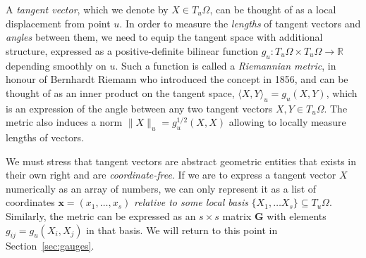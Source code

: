 A {\em tangent vector}, which we denote by $X\in T_u\Omega$, can be thought of as a local displacement from point $u$. 
In order to measure the \emph{lengths} of tangent vectors and  \emph{angles} between them, %
%
%
we need to equip the tangent space with additional structure, expressed as a 
positive-definite bilinear function
$g_u: T_u\Omega \times T_u\Omega \rightarrow \mathbb{R}$ depending smoothly on $u$. Such a function is 
called a {\em Riemannian metric}, in honour of Bernhardt Riemann who introduced the concept in 1856, and can be thought of as an inner product on the tangent space, $\langle X, Y \rangle_u = g_u(X,Y)$, which is an expression of the angle between any two tangent vectors $X, Y \in T_u\Omega$. 
%
The metric also induces a norm $\| X \|_u = g_u^{1/2}(X,X)$ allowing to locally measure lengths of vectors. 



We must stress that tangent vectors 
are abstract geometric entities that exists in their own right and are {\em coordinate-free}. If we are to express a tangent vector $X$ numerically as an array of numbers, we can only represent it as a list of coordinates $\mathbf{x}=(x_1, \hdots, x_s)$ {\em relative to some local basis} $\{ X_1, \hdots X_s \} \subseteq T_u\Omega$.   
%
Similarly, the metric can be expressed as an $s\times s$ matrix $\mathbf{G}$ with elements $g_{ij} = g_u(X_i,X_j)$ in that basis. 
%
We will return to this point in Section~\ref{sec:gauges}. 

%



